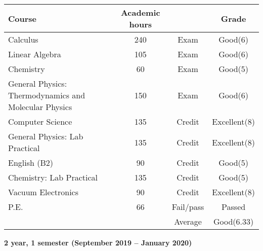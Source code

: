\documentclass[a4paper]{article}
\newcommand{\upperRomannumeral}[1]{\uppercase\expandafter{\romannumeral#1}}
\begin{document}
\begin{tabular}{|p{6cm}|c|c|c|}
\hline
\textbf{Course}&\textbf{Academic hours}& &\textbf{Grade}\\
\hline
Calculus \upperRomannumeral{2} & 240 & Exam & Good(6)\\

Linear Algebra & 105 & Exam & Good(6)\\

Chemistry & 60 & Exam & Good(5)\\

General Physics: Thermodynamics and Molecular Physics & 150 & Exam & Good(6)\\

Computer Science & 135 & Credit & Excellent(8)\\

General Physics: Lab Practical & 135 & Credit & Excellent(8)\\

English (B2) & 90 & Credit & Good(5)\\

Chemistry: Lab Practical & 135 & Credit & Good(5)\\

Vacuum Electronics & 90 & Credit & Excellent(8)\\

P.E. & 66 & Fail/pass & Passed \\
\hline
&& Average & Good(6.33)\\
\hline
\end{tabular}
\clearpage
\textbf{2 year, 1 semester (September 2019 -- January 2020)}\\ \\
\end{document}
